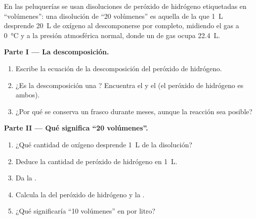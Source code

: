 \begin{problem}
\label{pb:g12:catalysis:1}
En las peluquerías se usan disoluciones de peróxido de hidrógeno
etiquetadas en ``volúmenes'': una disolución de ``20 volúmenes'' es
aquella de la que \qty{1}{L} desprende \qty{20}{L} de oxígeno al
descomponerse por completo, midiendo el gas a \qty{0}{\celsius} y a la
presión atmosférica normal, donde un  de gas ocupa \qty{22.4}{L}.

\medskip
\noindent\textbf{Parte I --- La descomposición.}
\begin{enumerate}
  \item Escribe la ecuación de la descomposición del peróxido de
        hidrógeno.
  \item ¿Es la descomposición una ? Encuentra el  y
        el  (el peróxido de hidrógeno es ambos).
  \item ¿Por qué se conserva un frasco durante meses, aunque la reacción
        sea posible?
\end{enumerate}

\medskip
\noindent\textbf{Parte II --- Qué significa ``20 volúmenes''.}
\begin{enumerate}[resume]
  \item ¿Qué cantidad de oxígeno desprende \qty{1}{L} de la disolución?
  \item Deduce la cantidad de peróxido de hidrógeno en \qty{1}{L}.
  \item Da la .
  \item Calcula la  del peróxido de hidrógeno y la
        .
  \item ¿Qué significaría ``10 volúmenes'' en  por litro?
\end{enumerate}


\end{problem}
